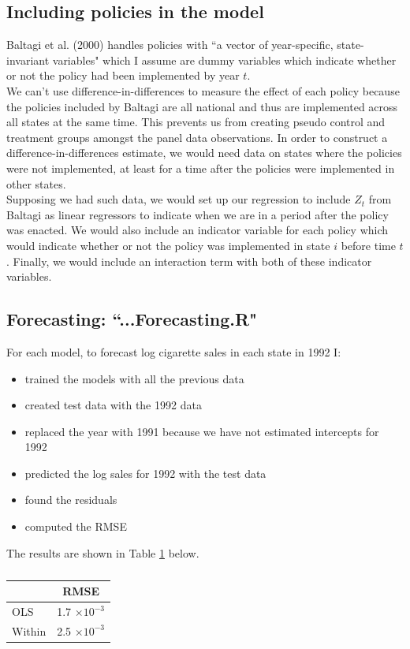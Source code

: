 \documentclass{article}
\begin{document}
\subsection{Including policies in the model}
Baltagi et al. (2000) handles policies with ``a vector of year-specific, state-invariant variables" which I assume are dummy variables which indicate whether or not the policy had been implemented by year $t$.\\

We can't use difference-in-differences to measure the effect of each policy because the policies included by Baltagi are all national and thus are implemented across all states at the same time. This prevents us from creating pseudo control and treatment groups amongst the panel data observations. In order to construct a difference-in-differences estimate, we would need data on states where the policies were not implemented, at least for a time after the policies were implemented in other states.\\

Supposing we had such data, we would set up our regression to include $Z_t$ from Baltagi as linear regressors to indicate when we are in a period after the policy was enacted. We would also include an indicator variable for each policy which would indicate whether or not the policy was implemented in state $i$ before time $t$. Finally, we would include an interaction term with both of these indicator variables.

\subsection{Forecasting: ``...Forecasting.R"}
For each model, to forecast log cigarette sales in each state in 1992 I:
\begin{itemize}
\item  trained the models with all the previous data
\item created test data with the 1992 data
\item replaced the year with 1991 because we have not estimated intercepts for 1992
\item predicted the log sales for 1992 with the test data
\item found the residuals
\item computed the RMSE
\end{itemize}

The results are shown in Table \ref{Forecast} below.

\begin{table}[H]
\centering
\caption{}
\label{Forecast}
\begin{tabular}{@{}  l c @{}}
 & \textbf{RMSE} \\\midrule
OLS & 1.7 $\times 10^{-3}$\\
Within & 2.5 $\times 10^{-3}$\\
\bottomrule
\hline
\end{tabular}
\end{table}
\end{document}
